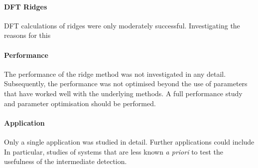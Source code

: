 \paragraph{DFT Ridges}
DFT calculations of ridges were only moderately successful.
Investigating the reasons for this \expand {}

\paragraph{Performance}
The performance of the ridge method was not investigated in any detail.
Subsequently, the performance was not optimised beyond the use of parameters that have worked well with the underlying methods.
A full performance study and parameter optimisation should be performed.

\paragraph{Application}
Only a single application was studied in detail.
Further applications could include \expand
In particular, studies of systems that are less known \textit{a priori} to test the usefulness of the intermediate  detection.
